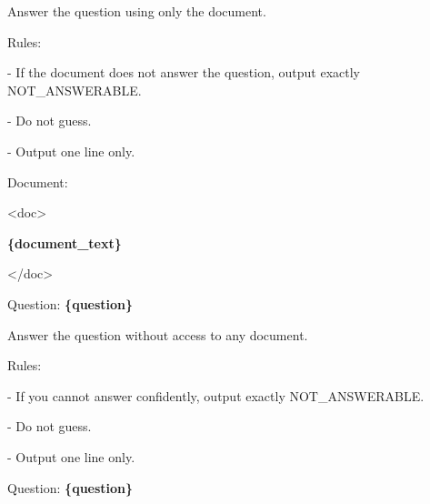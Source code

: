 \begin{tcolorbox}[colback=white, colframe=my-green, coltitle=black, parskip=5mm, title=\textbf{Document-Only Answerability Check}, halign=flush left, enhanced, breakable, skin first=enhanced, skin middle=enhanced, skin last=enhanced]
\begin{scriptsize}
\ttfamily
\setlength{\parindent}{0pt}
Answer the question using only the document.\par
\mbox{}\par
Rules:\par
- If the document does not answer the question, output exactly NOT\_ANSWERABLE.\par
- Do not guess.\par
- Output one line only.\par
\mbox{}\par
Document:\par
\textless{}doc\textgreater{}\par
\textcolor{my-green}{\textbf{\{document\_text\}}}\par
\textless{}/doc\textgreater{}\par
\mbox{}\par
Question: \textcolor{my-green}{\textbf{\{question\}}}\par
\end{scriptsize}
\end{tcolorbox}

\begin{tcolorbox}[colback=white, colframe=my-green, coltitle=black, parskip=5mm, title=\textbf{No-Document Memorization Check}, halign=flush left, enhanced, breakable, skin first=enhanced, skin middle=enhanced, skin last=enhanced]
\begin{scriptsize}
\ttfamily
\setlength{\parindent}{0pt}
Answer the question without access to any document.\par
\mbox{}\par
Rules:\par
- If you cannot answer confidently, output exactly NOT\_ANSWERABLE.\par
- Do not guess.\par
- Output one line only.\par
\mbox{}\par
Question: \textcolor{my-green}{\textbf{\{question\}}}\par
\end{scriptsize}
\end{tcolorbox}

